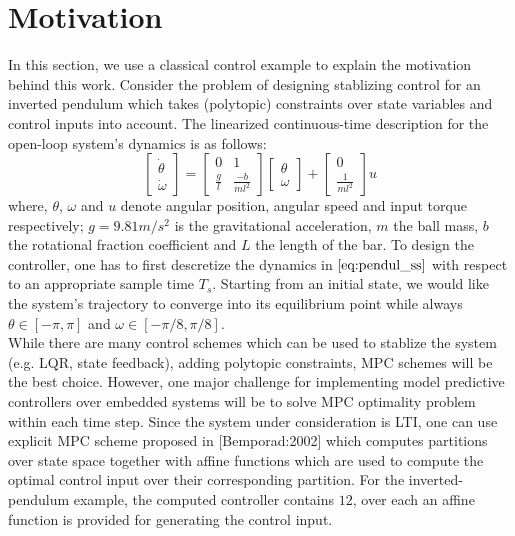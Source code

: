 \section{Motivation}
	In this section, we use a classical control example to explain the motivation behind this work. Consider the problem of designing stablizing control for an inverted pendulum which takes (polytopic) constraints over state variables and control inputs into account. The linearized continuous-time description for the open-loop system's dynamics is as follows:
	\begin{equation}
		\begin{bmatrix}
			\dot \theta\\
			\dot \omega
		\end{bmatrix}=
		\begin{bmatrix}
			0 & 1\\
			\frac{g}{l}& \frac{-b}{ml^2}		
		\end{bmatrix}
		\begin{bmatrix}
			\theta\\
			\omega
		\end{bmatrix}+
		\begin{bmatrix}
			0\\
			\frac{1}{ml^2}
		\end{bmatrix}u
		\label{eq:pendul_ss}
	\end{equation}
	where, $\theta$, $\omega$ and $u$ denote angular position, angular speed and input torque respectively; $g=9.81 m/s^2$ is the gravitational acceleration, $m$ the ball mass, $b$ the rotational fraction coefficient and $L$ the length of the bar. To design the controller, one has to first descretize the dynamics in $\eqref{eq:pendul_ss}$ with respect to an appropriate sample time $T_s$. Starting from an initial state, we would like the system's trajectory to converge into its equilibrium point while always $\theta\in[-\pi,\pi]$ and $\omega\in[-\pi/8,\pi/8]$. \\
	While there are many control schemes which can be used to stablize the system (e.g. LQR, state feedback), adding polytopic constraints, MPC schemes will be the best choice. 
	However, one major challenge for implementing model predictive controllers over embedded systems will be to solve MPC optimality problem within each time step. Since the system under consideration is LTI, one can use explicit MPC scheme proposed in [Bemporad:2002] which computes partitions over state space together with affine functions which are used to compute the optimal control input over their corresponding partition. For the inverted-pendulum example, the computed controller contains $12$, over each an affine function is provided for generating the control input.\\
